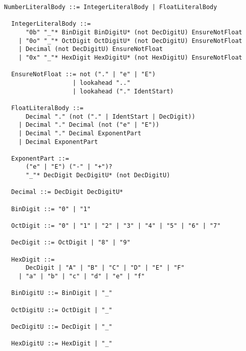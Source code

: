 \documentclass[dvipdfmx,uplatex,papersize,a4paper,10pt]{jsbook}
\theoremstyle{definition}
\begin{document}
\begin{lstlisting}[language=BNFLike, gobble=2]
  NumberLiteralBody ::= IntegerLiteralBody | FloatLiteralBody

  IntegerLiteralBody ::=
      "0b" "_"* BinDigit BinDigitU* (not DecDigitU) EnsureNotFloat
    | "0o" "_"* OctDigit OctDigitU* (not DecDigitU) EnsureNotFloat
    | Decimal (not DecDigitU) EnsureNotFloat
    | "0x" "_"* HexDigit HexDigitU* (not HexDigitU) EnsureNotFloat

  EnsureNotFloat ::= not ("." | "e" | "E")
                   | lookahead ".."
                   | lookahead ("." IdentStart)

  FloatLiteralBody ::=
      Decimal "." (not ("." | IdentStart | DecDigit))
    | Decimal "." Decimal (not ("e" | "E"))
    | Decimal "." Decimal ExponentPart
    | Decimal ExponentPart

  ExponentPart ::=
      ("e" | "E") ("-" | "+")?
      "_"* DecDigit DecDigitU* (not DecDigitU)

  Decimal ::= DecDigit DecDigitU*

  BinDigit ::= "0" | "1"

  OctDigit ::= "0" | "1" | "2" | "3" | "4" | "5" | "6" | "7"

  DecDigit ::= OctDigit | "8" | "9"

  HexDigit ::=
      DecDigit | "A" | "B" | "C" | "D" | "E" | "F"
    | "a" | "b" | "c" | "d" | "e" | "f"

  BinDigitU ::= BinDigit | "_"

  OctDigitU ::= OctDigit | "_"

  DecDigitU ::= DecDigit | "_"

  HexDigitU ::= HexDigit | "_"
\end{lstlisting}
\end{document}
